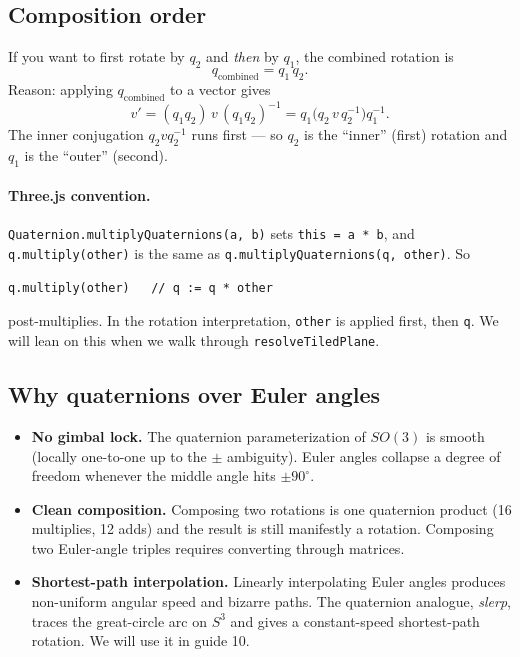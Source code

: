 \documentclass{article}
\begin{document}
\subsection{Composition order}

If you want to first rotate by $q_2$ and \emph{then} by $q_1$, the
combined rotation is
\[
  q_{\text{combined}} = q_1\, q_2.
\]
Reason: applying $q_{\text{combined}}$ to a vector gives
\[
  v' = (q_1 q_2)\, v\, (q_1 q_2)^{-1}
     = q_1\bigl(q_2\, v\, q_2^{-1}\bigr) q_1^{-1}.
\]
The inner conjugation $q_2 v q_2^{-1}$ runs first --- so $q_2$ is the
``inner'' (first) rotation and $q_1$ is the ``outer'' (second).

\paragraph{Three.js convention.} \texttt{Quaternion.multiplyQuaternions(a, b)}
sets \texttt{this = a * b}, and \texttt{q.multiply(other)} is the same as
\texttt{q.multiplyQuaternions(q, other)}. So
\begin{verbatim}
q.multiply(other)   // q := q * other
\end{verbatim}
post-multiplies. In the rotation interpretation, \texttt{other} is
applied first, then \texttt{q}. We will lean on this when we walk through
\texttt{resolveTiledPlane}.

\subsection{Why quaternions over Euler angles}

\begin{itemize}
\item \textbf{No gimbal lock.} The quaternion parameterization of $SO(3)$
is smooth (locally one-to-one up to the $\pm$ ambiguity). Euler angles
collapse a degree of freedom whenever the middle angle hits $\pm 90^\circ$.
\item \textbf{Clean composition.} Composing two rotations is one
quaternion product (16 multiplies, 12 adds) and the result is still
manifestly a rotation. Composing two Euler-angle triples requires
converting through matrices.
\item \textbf{Shortest-path interpolation.} Linearly interpolating Euler
angles produces non-uniform angular speed and bizarre paths. The
quaternion analogue, \emph{slerp}, traces the great-circle arc on $S^3$
and gives a constant-speed shortest-path rotation. We will use it in
guide 10.
\end{itemize}
\end{document}
